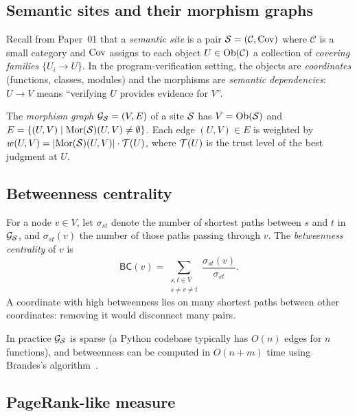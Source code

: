 \documentclass[11pt]{article}
\newcommand{\MG}{\mathcal{G}_{\Site}}       %
\newcommand{\BC}{\mathsf{BC}}               %
\newcommand{\wt}{w}                         %
\begin{document}
\subsection{Semantic sites and their morphism graphs}

Recall from Paper~01 that a \emph{semantic site} is a pair
$\mathcal{S} = (\mathcal{C}, \mathrm{Cov})$ where $\mathcal{C}$ is a small category
and $\mathrm{Cov}$ assigns to each object $U \in \mathrm{Ob}(\mathcal{C})$ a collection
of \emph{covering families} $\{U_i \to U\}$.  In the program-verification
setting, the objects are \emph{coordinates} (functions, classes, modules)
and the morphisms are \emph{semantic dependencies}: $U \to V$ means
``verifying $U$ provides evidence for $V$''.

\begin{definition}\label{def:morphism-graph}
The \emph{morphism graph} $\MG = (V, E)$ of a site $\mathcal{S}$ has
$V = \mathrm{Ob}(\mathcal{S})$ and $E = \{(U, V) \mid \mathrm{Mor}(\mathcal{S})(U, V) \neq
\emptyset\}$.  Each edge $(U, V) \in E$ is weighted by
$\wt(U,V) = |\Mor(\Site)(U,V)| \cdot \trust(U)$,
where $\mathcal{T}(U)$ is the trust level of the best judgment at $U$.
\end{definition}

\subsection{Betweenness centrality}

\begin{definition}\label{def:betweenness}
For a node $v \in V$, let $\sigma_{st}$ denote the number of shortest
paths between $s$ and $t$ in $\MG$, and $\sigma_{st}(v)$ the number
of those paths passing through $v$.  The \emph{betweenness centrality}
of $v$ is
\[
  \BC(v) = \sum_{\substack{s, t \in V \\ s \neq v \neq t}}
           \frac{\sigma_{st}(v)}{\sigma_{st}}.
\]
A coordinate with high betweenness lies on many shortest paths between
other coordinates: removing it would disconnect many pairs.
\end{definition}

\begin{remark}
In practice $\MG$ is sparse (a Python codebase typically has $O(n)$
edges for $n$ functions), and betweenness can be computed in
$O(n + m)$ time using Brandes's algorithm~\cite{Brandes2001}.
\end{remark}

\subsection{PageRank-like measure}
\end{document}
